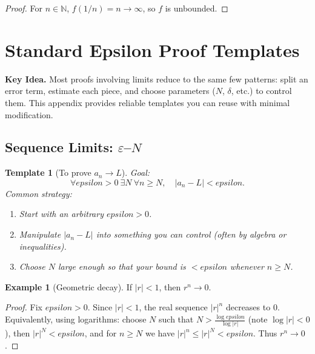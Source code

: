 \documentclass[12pt]{article}
\numberwithin{equation}{section}
\def\eps{epsilon}
\newcommand{\NN}{\mathbb{N}}
\newcommand{\eps}{\varepsilon}               %
\theoremstyle{plain}
\newtheorem{template}{Template}[section]
\theoremstyle{definition}
\newtheorem{example}[theorem]{Example}
\theoremstyle{remark}
\newenvironment{keyidea}{\begin{tcolorbox}\textbf{Key Idea.}}{\end{tcolorbox}}
\begin{document}
\begin{proof}
For $n\in\NN$, $f(1/n)=n\to\infty$, so $f$ is unbounded.
\end{proof}

\newpage

\section{Standard Epsilon Proof Templates}

\begin{keyidea}
Most proofs involving limits reduce to the same few patterns:
split an error term, estimate each piece, and choose parameters ($N$, $\delta$, etc.) to control them.
This appendix provides reliable templates you can reuse with minimal modification.
\end{keyidea}

\subsection{Sequence Limits: $\varepsilon$--$N$}

\begin{template}[To prove $a_n\to L$]\label{tmp:seq-limit}
Goal:
\[
\forall \eps>0\ \exists N\ \forall n\ge N,\quad |a_n-L|<\eps.
\]
Common strategy:
\begin{enumerate}[label=(\arabic*)]
\item Start with an arbitrary $\eps>0$.
\item Manipulate $|a_n-L|$ into something you can control (often by algebra or inequalities).
\item Choose $N$ large enough so that your bound is $<\eps$ whenever $n\ge N$.
\end{enumerate}
\end{template}

\begin{example}[Geometric decay]\label{ex:app_geom}
If $|r|<1$, then $r^n\to 0$.
\end{example}

\begin{proof}
Fix $\eps>0$. Since $|r|<1$, the real sequence $|r|^n$ decreases to $0$.
Equivalently, using logarithms: choose $N$ such that $N>\frac{\log \eps}{\log |r|}$ (note $\log|r|<0$), then
$|r|^N<\eps$, and for $n\ge N$ we have $|r|^n\le |r|^N<\eps$.
Thus $r^n\to 0$.
\end{proof}
\end{document}
